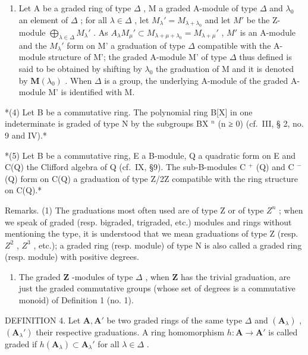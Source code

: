 \begin{enumerate}
\def\labelenumi{(\arabic{enumi})}
\setcounter{enumi}{2}
\tightlist
\item
  Let A be a graded ring of type \(\Delta\) , M a graded A-module of type \(\Delta\) and \(\lambda_0\) an element of \(\Delta\) ; for all \(\lambda \in \Delta\) , let \(M_{\lambda}' = M_{\lambda + \lambda_0}\) and let \(M'\) be the Z-module \(\bigoplus_{\lambda \in \Delta} M_{\lambda}'\) . As \(A_{\lambda}M_{\mu}' \subset M_{\lambda + \mu + \lambda_0} = M_{\lambda + \mu}'\) , \(M'\) is an A-module and the \(M_{\lambda}'\) form on M' a graduation of type \(\Delta\) compatible with the A-module structure of M'; the graded A-module M' of type \(\Delta\) thus defined is said to be obtained by shifting by \(\lambda_{0}\) the graduation of M and it is denoted by \(\mathbf{M}(\lambda_{0})\) . When \(\Delta\) is a group, the underlying A-module of the graded A-module M' is identified with M.
\end{enumerate}

*(4) Let B be a commutative ring. The polynomial ring B{[}X{]} in one indeterminate is graded of type N by the subgroups BX \(^{n}\) (n ≥ 0) (cf.~III, § 2, no. 9 and IV).*

*(5) Let B be a commutative ring, E a B-module, Q a quadratic form on E and C(Q) the Clifford algebra of Q (cf.~IX, §9). The sub-B-modules C \(^{+}\) (Q) and C \(^{-}\) (Q) form on C(Q) a graduation of type Z/2Z compatible with the ring structure on C(Q).*

Remarks. (1) The graduations most often used are of type Z or of type \(Z^{n}\) ; when we speak of graded (resp. bigraded, trigraded, etc.) modules and rings without mentioning the type, it is understood that we mean graduations of type Z (resp. \(Z^{2}\) , \(Z^{3}\) , etc.); a graded ring (resp. module) of type N is also called a graded ring (resp. module) with positive degrees.

\begin{enumerate}
\def\labelenumi{(\arabic{enumi})}
\setcounter{enumi}{1}
\tightlist
\item
  The graded \(\mathbf{Z}\) -modules of type \(\Delta\) , when \(\mathbf{Z}\) has the trivial graduation, are just the graded commutative groups (whose set of degrees is a commutative monoid) of Definition 1 (no. 1).
\end{enumerate}

DEFINITION 4. Let \(\mathbf{A}, \mathbf{A}'\) be two graded rings of the same type \(\Delta\) and \((\mathbf{A}_{\lambda})\) , \((\mathbf{A}_{\lambda}')\) their respective graduations. A ring homomorphism \(h: \mathbf{A} \to \mathbf{A}'\) is called graded if \(h(\mathbf{A}_{\lambda}) \subset \mathbf{A}_{\lambda}'\) for all \(\lambda \in \Delta\) .

